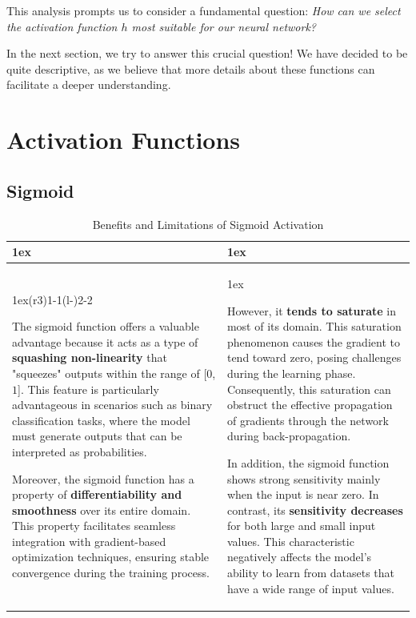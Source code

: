 This analysis prompts us to consider a fundamental question: \textit{How can we select the activation function $h$ most suitable for our neural network?}

In the next section, we try to answer this crucial question! 
We have decided to be quite descriptive, as we believe that more details about these functions can facilitate a deeper understanding.

\section{Activation Functions}

\subsection{Sigmoid}

\begin{table}[h]
\begin{tabularx}{\linewidth}{>{\parskip1ex}X@{\kern4\tabcolsep}>{\parskip1ex}X}
\toprule
\hfil\bfseries \color{mybluee}{Pros}
&
\hfil\bfseries \color{mybluee}{Cons}
\\\cmidrule(r{3\tabcolsep}){1-1}\cmidrule(l{-\tabcolsep}){2-2}

The sigmoid function offers a valuable advantage because it acts as a type of \textbf{\textcolor{mybluee}{squashing non-linearity}} that "squeezes" outputs within the range of [$0$, $1$]. This feature is particularly advantageous in scenarios such as binary classification tasks, where the model must generate outputs that can be interpreted as probabilities.

Moreover, the sigmoid function has a property of \textbf{\textcolor{mybluee}{differentiability and smoothness}} over its entire domain. This property facilitates seamless integration with gradient-based optimization techniques, ensuring stable convergence during the training process.
&

However, it \textbf{\textcolor{mybluee}{tends to saturate}} in most of its domain. This saturation phenomenon causes the gradient to tend toward zero, posing challenges during the learning phase. Consequently, this saturation can obstruct the effective propagation of gradients through the network during back-propagation.

In addition, the sigmoid function shows strong sensitivity mainly when the input is near zero. In contrast, its \textbf{\textcolor{mybluee}{sensitivity decreases}} for both large and small input values. This characteristic negatively affects the model's ability to learn from datasets that have a wide range of input values.
\\\bottomrule
\end{tabularx}
\caption{Benefits and Limitations of Sigmoid Activation}
\end{table}

